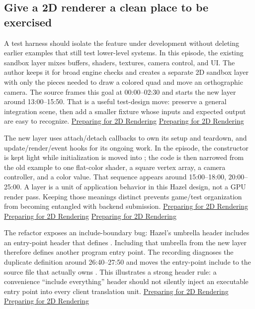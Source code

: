 \subsection{Give a 2D renderer a clean place to be exercised}\label{06-engine-ii-ch025-give-a-2d-renderer-a-clean-place-to-be-exercised}

\hypertarget{06-engine-ii-ch025-give-a-2d-renderer-a-clean-place-to-be-exercised}{}

A test harness should isolate the feature under development without deleting earlier examples that still test lower-level systems. In this episode, the existing sandbox layer mixes buffers, shaders, textures, camera control, and UI. The author keeps it for broad engine checks and creates a separate 2D sandbox layer with only the pieces needed to draw a colored quad and move an orthographic camera. The source frames this goal at 00:00--02:30 and starts the new layer around 13:00--15:50. That is a useful test-design move: preserve a general integration scene, then add a smaller fixture whose inputs and expected output are easy to recognize. \href{https://www.youtube.com/watch?v=sEiZZ2APlDs&t=0s}{Preparing for 2D Rendering} \href{https://www.youtube.com/watch?v=sEiZZ2APlDs&t=780s}{Preparing for 2D Rendering}

The new layer uses attach/detach callbacks to own its setup and teardown, and update/render/event hooks for its ongoing work. In the episode, the constructor is kept light while initialization is moved into ; the code is then narrowed from the old example to one flat-color shader, a square vertex array, a camera controller, and a color value. That sequence appears around 15:00--18:00, 20:00--25:00. A layer is a unit of application behavior in this Hazel design, not a GPU render pass. Keeping those meanings distinct prevents game/test organization from becoming entangled with backend submission. \href{https://www.youtube.com/watch?v=sEiZZ2APlDs&t=900s}{Preparing for 2D Rendering} \href{https://www.youtube.com/watch?v=sEiZZ2APlDs&t=1200s}{Preparing for 2D Rendering} \href{https://www.youtube.com/watch?v=sEiZZ2APlDs&t=1380s}{Preparing for 2D Rendering}

The refactor exposes an include-boundary bug: Hazel's umbrella header includes an entry-point header that defines . Including that umbrella from the new layer therefore defines another program entry point. The recording diagnoses the duplicate definition around 26:40--27:50 and moves the entry-point include to the source file that actually owns . This illustrates a strong header rule: a convenience ``include everything'' header should not silently inject an executable entry point into every client translation unit. \href{https://www.youtube.com/watch?v=sEiZZ2APlDs&t=1600s}{Preparing for 2D Rendering} \href{https://www.youtube.com/watch?v=sEiZZ2APlDs&t=1670s}{Preparing for 2D Rendering}

